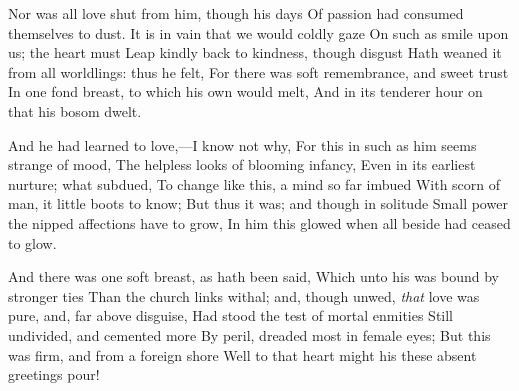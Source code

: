 \documentclass[10pt,twocolumn]{book}
\begin{document}
   Nor was all love shut from him, though his days
   Of passion had consumed themselves to dust.
   It is in vain that we would coldly gaze
   On such as smile upon us; the heart must
   Leap kindly back to kindness, though disgust
   Hath weaned it from all worldlings:  thus he felt,
   For there was soft remembrance, and sweet trust
   In one fond breast, to which his own would melt,
And in its tenderer hour on that his bosom dwelt.


   And he had learned to love,---I know not why,
   For this in such as him seems strange of mood,\textemdash
   The helpless looks of blooming infancy,
   Even in its earliest nurture; what subdued,
   To change like this, a mind so far imbued
   With scorn of man, it little boots to know;
   But thus it was; and though in solitude
   Small power the nipped affections have to grow,
In him this glowed when all beside had ceased to glow.


   And there was one soft breast, as hath been said,
   Which unto his was bound by stronger ties
   Than the church links withal; and, though unwed,
   \textit{that} love was pure, and, far above disguise,
   Had stood the test of mortal enmities
   Still undivided, and cemented more
   By peril, dreaded most in female eyes;
   But this was firm, and from a foreign shore
Well to that heart might his these absent greetings pour!

\spatium {1\leading}
\end{document}
